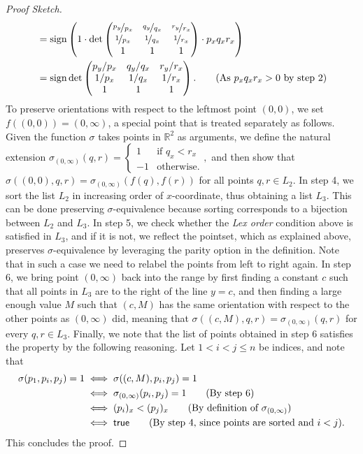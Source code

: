 \begin{proof}[Proof Sketch]
\begin{align*}
                        &= \operatorname{sign} \left(1 \cdot \det  \begin{pmatrix} \nicefrac{p_y}{p_x} & \nicefrac{q_y}{q_x} & \nicefrac{r_y}{r_x} \\ \nicefrac{1}{p_x} & \nicefrac{1}{q_x} & \nicefrac{1}{r_x} \\ 1 & 1 & 1 \end{pmatrix} \cdot  p_x q_x r_x  \right)\\ &= \operatorname{sign} \det \begin{pmatrix} p_y/p_x & q_y/q_x & r_y/r_x \\ 1/p_x & 1/q_x & 1/r_x \\ 1 & 1 & 1 \end{pmatrix}.\tag{As $p_x q_x r_x > 0$ by step 2}
\end{align*}
To preserve orientations with respect to the leftmost point $(0, 0)$, we set $f( (0, 0)) = (0, \infty)$, a special point that is treated separately as follows. Given the function $\sigma$ takes points in $\mathbb{R}^2$ as arguments, we define the natural extension
\(
  \sigma_{(0, \infty)}(q, r) = \begin{cases}
    1 & \text{if } q_x < r_x \\
    -1 & \text{otherwise}.  
  \end{cases},
\)
and then show that $\sigma((0, 0), q, r) = \sigma_{(0, \infty)}(f(q), f(r))$ for all points $q, r \in L_2$. 
In step 4, we sort the list $L_2$ in increasing order of $x$-coordinate, thus obtaining a list $L_3$. This can be done preserving $\sigma$-equivalence because sorting corresponds to a bijection between $L_2$ and $L_3$.
In step 5, we check whether the \emph{Lex order} condition above is satisfied in $L_3$, and if it is not, we reflect the pointset, which as explained above, preserves $\sigma$-equivalence by leveraging the parity option in the definition. Note that in such a case we need to relabel the points from left to right again.
In step 6, we bring point $(0, \infty)$ back into the range by first finding a constant $c$ such that all points in $L_3$ are to the right of the line $y=c$, and then finding a large enough value $M$ such that $(c, M)$ has the same orientation with respect to the other points as $(0, \infty)$ did, meaning that 
\(\sigma((c, M), q, r) = \sigma_{(0, \infty)}(q, r)\) for every $q, r \in L_3$.
Finally, we note that the list of points obtained in step 6 satisfies the  property by the following reasoning. Let $1 < i < j \leq n$ be indices, and note that 
\begin{align*}
  \sigma(p_1, p_i, p_j) = 1 &\iff \sigma((c, M), p_i, p_j) = 1\\
                            &\iff \sigma_{(0, \infty)}(p_i, p_j) = 1\tag{By step 6}\\
                            &\iff (p_i)_x < (p_j)_x \tag{By definition of $\sigma_{(0, \infty)}$}\\
                            &\iff \textsf{true} \tag{By step 4, since points are sorted and $i < j$}.
\end{align*}
This concludes the proof.
\end{proof}

